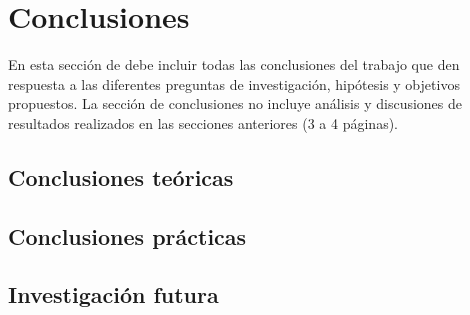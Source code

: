 \chapter{Conclusiones}
\label{ch:conclu} %

{\color{blue} En esta sección de debe incluir todas las conclusiones del trabajo que den respuesta a las diferentes preguntas de investigación, hipótesis y objetivos propuestos. 
La sección de conclusiones no incluye análisis y discusiones de resultados realizados en las secciones anteriores (3 a 4 páginas). }

\section{Conclusiones teóricas}
\section{Conclusiones prácticas}
\section{Investigación futura}

